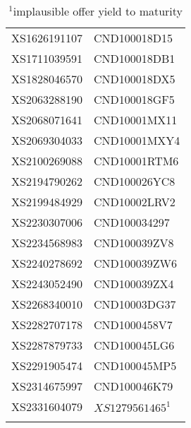 \begin{table}[H]
\begin{tabular}{ll}
{XS1626191107} & {CND100018D15} \\
{XS1711039591} & {CND100018DB1} \\
{XS1828046570} & {CND100018DX5} \\
{XS2063288190} & {CND100018GF5} \\
{XS2068071641} & {CND10001MX11} \\
{XS2069304033} & {CND10001MXY4} \\
{XS2100269088} & {CND10001RTM6} \\
{XS2194790262} & {CND100026YC8} \\
{XS2199484929} & {CND10002LRV2} \\
{XS2230307006} & {CND100034297} \\
{XS2234568983} & {CND100039ZV8} \\
{XS2240278692} & {CND100039ZW6} \\
{XS2243052490} & {CND100039ZX4} \\
{XS2268340010} & {CND10003DG37} \\
{XS2282707178} & {CND1000458V7} \\
{XS2287879733} & {CND100045LG6} \\
{XS2291905474} & {CND100045MP5} \\
{XS2314675997} & {CND100046K79} \\
{XS2331604079} & {${XS1279561465}^1$} \\
\hline \\[-1.8ex] 
\end{tabular}
\caption*{\small{$^1$implausible offer yield to maturity}}
\end{table}